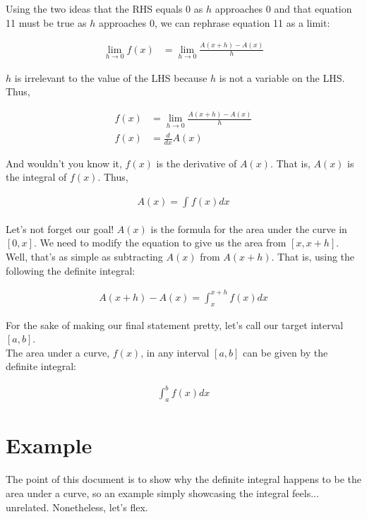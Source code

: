 \documentclass{article}
\begin{document}
\noindent
Using the two ideas that the RHS equals 0 as $h$ approaches 0 and that equation 11 must be true as $h$ approaches 0, we can   rephrase equation 11 as a limit:

\begin{align}
\lim_{h \to 0} f(x) &= \lim_{h \to 0} \frac{A(x+h)-A(x)}{h}
\end{align}

\noindent
$h$ is irrelevant to the value of the LHS because $h$ is not a variable on the LHS. \\

\noindent
Thus,

\begin{align}
f(x) &= \lim_{h \to 0} \frac{A(x+h)-A(x)}{h} \\
f(x) &= \frac{d}{dx}A(x)
\end{align}

\noindent
And wouldn't you know it, $f(x)$ is the derivative of $A(x)$. That is, $A(x)$ is the integral of $f(x)$. Thus,

\begin{align}
A(x) = \int_{}^{}f(x)dx
\end{align}

\noindent
Let's not forget our goal! $A(x)$ is the formula for the area under the curve in $[0,x]$. We need to modify the equation to give us the area from $[x,x+h]$. Well, that's as simple as subtracting $A(x)$ from $A(x+h)$. That is, using the following the definite integral:

\begin{align}
A(x+h) - A(x) = \int_{x}^{x+h}f(x)dx
\end{align}

\noindent
For the sake of making our final statement pretty, let's call our target interval $[a,b]$. \\

\noindent
The area under a curve, $f(x)$, in any interval $[a,b]$ can be given by the definite integral:

\begin{align}
\int_{a}^{b}f(x)dx
\end{align}

\newpage
\section{Example}
The point of this document is to show why the definite integral happens to be the area under a curve, so an example simply showcasing the integral feels... unrelated. Nonetheless, let's flex. \\
\end{document}

